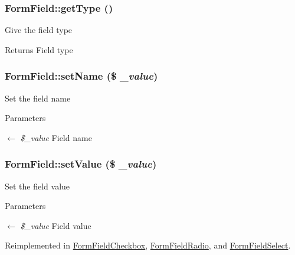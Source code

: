 \subsubsection[{getType}]{\setlength{\rightskip}{0pt plus 5cm}FormField::getType ()}\label{classFormField_a1f64b737bccb6b2827f8c5665b9920c7}
Give the field type \begin{DoxyReturn}{Returns}
Field type 
\end{DoxyReturn}
\subsubsection[{setName}]{\setlength{\rightskip}{0pt plus 5cm}FormField::setName (\$ {\em \_\-value})}\label{classFormField_ad57e32bd53170af060e869b3b60f0ef7}
Set the field name 
\begin{DoxyParams}{Parameters}
\item[\mbox{$\leftarrow$} {\em \$\_\-value}]Field name \end{DoxyParams}
\subsubsection[{setValue}]{\setlength{\rightskip}{0pt plus 5cm}FormField::setValue (\$ {\em \_\-value})}\label{classFormField_a465ff61e290d82be96bb793c3a14b3e7}
Set the field value 
\begin{DoxyParams}{Parameters}
\item[\mbox{$\leftarrow$} {\em \$\_\-value}]Field value \end{DoxyParams}


Reimplemented in \hyperlink{classFormFieldCheckbox_a787abee157599c389a18e0810f69fed5}{FormFieldCheckbox}, \hyperlink{classFormFieldRadio_aab105e92866fd80890d3254f51a2e4ca}{FormFieldRadio}, and \hyperlink{classFormFieldSelect_ae69f5b352df63796c048dca6a2de7544}{FormFieldSelect}.



